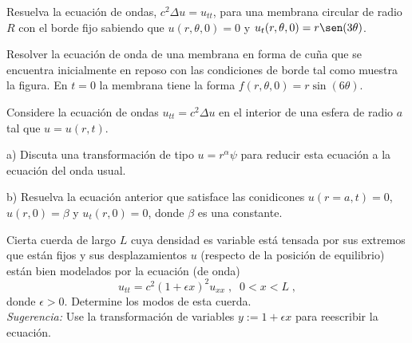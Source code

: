 \documentclass[11pt,spanish]{article}
\begin{document}
\prob{} Resuelva la ecuaci\'on de ondas, $c^2 \Delta u = u_{tt}$, para una membrana circular de radio $R$ con el borde fijo sabiendo que $u(r,\theta,0)=0$ y $u_t(r,\theta,0)=r \sen (3\theta)$. 

\prob{} Resolver la ecuaci\'on de onda de una membrana en forma de cu\~na que se encuentra inicialmente en reposo con las condiciones de borde tal como muestra la figura.  En $t=0$ la membrana tiene la forma $f(r,\theta,0)=r\sin(6 \theta)$.
\begin{center}
\end{center}


\prob{} Considere la  ecuaci\'on de ondas $u_{tt}= c^2\Delta u$ en el interior de una esfera de radio $a$ tal que $u=u(r,t)$. 

a) Discuta una transformaci\'on de tipo $u = r^{\alpha}\psi$ para reducir esta ecuaci\'on a la  ecuaci\'on del onda usual.

b) Resuelva la ecuación anterior que satisface las conidicones $u(r=a,t)=0$, $u(r,0)=\beta$ y $u_t(r,0)=0$, donde $\beta$ es una constante.

\prob{} Cierta cuerda de largo $L$ cuya densidad es variable est\'a tensada por sus extremos que est\'an fijos y sus desplazamientos $u$ (respecto de la posici\'on de equilibrio) est\'an bien modelados por la ecuaci\'on (de onda)
\[ u_{tt} = c^2 (1+ \epsilon x )^2 u_{xx}\;,\;\; 0<x<L\;,\]
donde $\epsilon >0$.
Determine los modos de esta cuerda.\\
\textit{Sugerencia:} Use la transformaci\'on de variables  $y:= 1+ \epsilon x$ para reescribir la ecuaci\'on.\\
\end{document}
